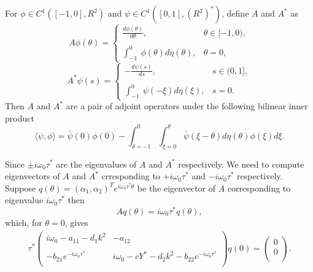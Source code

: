 \documentclass[10pt]{amsart}
\theoremstyle{definition}
\begin{document}
For $\phi \in C^{1}([-1,0],R^{2})$ and $\psi \in C^{1}([0,1],(R^2)^*)$, define $A$ and $A^*$ as
$$ A\phi(\theta) =\left\{\begin{array}{ll}\displaystyle{\frac{d \phi(\theta)}{d \theta} },& \theta \in [-1,0),\\
\\ \int_{-1}^{0}~\phi(\theta)d\eta(\theta),& \theta  = 0, \end{array}\right.$$
$$A^{*} \psi (s) = 
\left\{\begin{array}{ll}-\displaystyle{\frac{d \psi (s)}{d s}},& s \in (0,1], \\
 \\ \int_{-1}^{0}~ \psi (-\xi)d {\eta} (\xi),& s=0.
  \end{array}\right. $$
Then $A$ and $A^*$ are a pair of adjoint operators under the following bilinear inner product
\begin{equation}\label{eq:4.7}
\langle \psi ,\phi  \rangle = \bar{\psi} (0) \phi (0)-
\int_{\theta = -1}^{0} \int_{\xi = 0}^{\theta} \bar{\psi} (\xi -\theta) d \eta (\theta) \phi (\xi) d \xi .
\end{equation}

Since $\pm i\omega_{0}
\tau^{*}$ are the eigenvalues of $A$ and $A^*$ respectively.
We need to compute eigenvectors of $A$ and $A^*$ crresponding to
 $+i\omega_{0}\tau^{*}$ and $-i\omega_{0}\tau^{*}$ respectively.\\
 \noindent Suppose $q(\theta)=(\alpha_1,\alpha_2)^{T}e^{i\omega_{0}\tau^{*}\theta}$
 be the eigenvector of $A$ corresponding to eigenvalue $i\omega_{0}\tau^{*}$ then\\
 \begin{equation}\label{eq:4.8}
 Aq(\theta)=i\omega_{0}\tau^{*}q(\theta),
 \end{equation}
 which, for $\theta=0$, gives
\begin{align}\label{eq:4.9}
\tau^{*}\left(
 \begin{array}{cc}
  {i\omega_0-a_{11}-d_1k^2} & {-a_{12}}\\ \\
     {-b_{21} e^{-i\omega_0 \tau^*}} & {i\omega_0-cY^*-d_2k^2-b_{22} e^{-i\omega_0 \tau^*}}\\
  \end{array}
  \right)q(0)
	=\left(
    \begin{array}{cc}
    0 \\
    0\\
\end{array}
\right).
\end{align}
\end{document}

